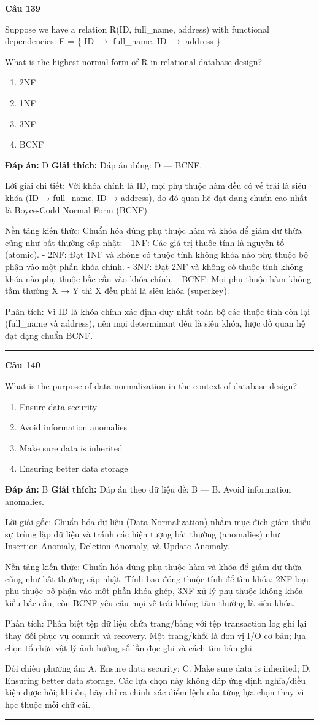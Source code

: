 \documentclass[11pt,a4paper]{article}
\newenvironment{question}[1]{%
  \par\vspace{1em}\noindent\textbf{\large Câu #1}\par\vspace{0.4em}
}{%
  \par\vspace{1em}\hrule\vspace{0.6em}
}
\newenvironment{choices}{%
  \begin{enumerate}[label=\textbf{\Alph*.},leftmargin=2.2em,itemsep=2pt,topsep=3pt]
}{%
  \end{enumerate}
}
\newcommand{\choice}{\item}
\begin{document}
\begin{question}{139}
Suppose we have a relation R(ID, full_name, address) with functional dependencies:
F = \{ ID $\to$ full_name, ID $\to$ address \}

What is the highest normal form of R in relational database design?
\begin{choices}
\choice 2NF
\choice 1NF
\choice 3NF
\choice BCNF
\end{choices}
\textbf{Đáp án:} D
\textbf{Giải thích:} Đáp án đúng: D — BCNF.

Lời giải chi tiết: Với khóa chính là ID, mọi phụ thuộc hàm đều có vế trái là siêu khóa (ID → full_name, ID → address), do đó quan hệ đạt dạng chuẩn cao nhất là Boyce-Codd Normal Form (BCNF).

Nền tảng kiến thức: Chuẩn hóa dùng phụ thuộc hàm và khóa để giảm dư thừa cũng như bất thường cập nhật:
- 1NF: Các giá trị thuộc tính là nguyên tố (atomic).
- 2NF: Đạt 1NF và không có thuộc tính không khóa nào phụ thuộc bộ phận vào một phần khóa chính.
- 3NF: Đạt 2NF và không có thuộc tính không khóa nào phụ thuộc bắc cầu vào khóa chính.
- BCNF: Mọi phụ thuộc hàm không tầm thường X → Y thì X đều phải là siêu khóa (superkey).

Phân tích: Vì ID là khóa chính xác định duy nhất toàn bộ các thuộc tính còn lại (full_name và address), nên mọi determinant đều là siêu khóa, lược đồ quan hệ đạt dạng chuẩn BCNF.
\end{question}

\begin{question}{140}
What is the purpose of data normalization in the context of database design?
\begin{choices}
\choice Ensure data security
\choice Avoid information anomalies
\choice Make sure data is inherited
\choice Ensuring better data storage
\end{choices}
\textbf{Đáp án:} B
\textbf{Giải thích:} Đáp án theo dữ liệu đề: B — B. Avoid information anomalies.

Lời giải gốc: Chuẩn hóa dữ liệu (Data Normalization) nhằm mục đích giảm thiểu sự trùng lặp dữ liệu và tránh các hiện tượng bất thường (anomalies) như Insertion Anomaly, Deletion Anomaly, và Update Anomaly.

Nền tảng kiến thức: Chuẩn hóa dùng phụ thuộc hàm và khóa để giảm dư thừa cũng như bất thường cập nhật. Tính bao đóng thuộc tính để tìm khóa; 2NF loại phụ thuộc bộ phận vào một phần khóa ghép, 3NF xử lý phụ thuộc không khóa kiểu bắc cầu, còn BCNF yêu cầu mọi vế trái không tầm thường là siêu khóa.

Phân tích: Phân biệt tệp dữ liệu chứa trang/bảng với tệp transaction log ghi lại thay đổi phục vụ commit và recovery. Một trang/khối là đơn vị I/O cơ bản; lựa chọn tổ chức vật lý ảnh hưởng số lần đọc ghi và cách tìm bản ghi.

Đối chiếu phương án: A. Ensure data security; C. Make sure data is inherited; D. Ensuring better data storage. Các lựa chọn này không đáp ứng định nghĩa/điều kiện được hỏi; khi ôn, hãy chỉ ra chính xác điểm lệch của từng lựa chọn thay vì học thuộc mỗi chữ cái.
\end{question}
\end{document}
